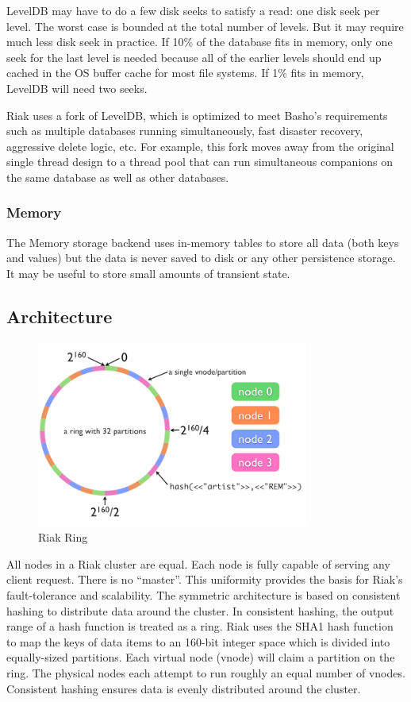 \documentclass[12pt]{book}
\begin{document}
LevelDB may have to do a few disk seeks to satisfy a read: one disk seek per level. The worst case is bounded at the total number of levels. But it may require much less disk seek in practice. If 10\% of the database fits in memory, only one seek for the last level is needed because all of the earlier levels should end up cached in the OS buffer cache for most file systems. If 1\% fits in memory, LevelDB will need two seeks.

Riak uses a fork of LevelDB, which is optimized to meet Basho's requirements such as multiple databases running simultaneously, fast disaster recovery, aggressive delete logic, etc. For example, this fork moves away from the original single thread design to a thread pool that can run simultaneous companions on the same database as well as other databases.

\subsubsection{Memory}
The Memory storage backend uses in-memory tables to store all data (both keys and values) but the data is never saved to disk or any other persistence storage. It may be useful to store small amounts of transient state.

\subsection{Architecture}

\begin{figure}[t]
\includegraphics[width=0.8\textwidth]{images/riak-ring.png}
\centering
\caption{Riak Ring}
\end{figure}

All nodes in a Riak cluster are equal. Each node is fully capable of serving any client request. There is no ``master''. This uniformity provides the basis for Riak's fault-tolerance and scalability. The symmetric architecture is based on consistent hashing to distribute data around the cluster. In consistent hashing, the output range of a hash function is treated as a ring. Riak uses the SHA1 hash function to map the keys of data items to an 160-bit integer space which is divided into equally-sized partitions. Each virtual node (vnode) will claim a partition on the ring. The physical nodes each attempt to run roughly an equal number of vnodes. Consistent hashing ensures data is evenly distributed around the cluster.
\end{document}
